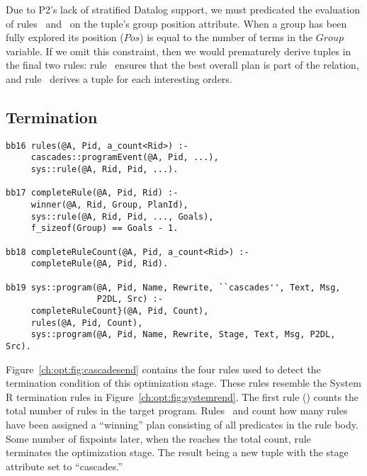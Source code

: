 Due to P2's lack of stratified Datalog support, we must predicated the
evaluation of rules~ and~ on the  tuple's group
position attribute.  When a group has been fully explored its 
position ($Pos$) is equal to the number of terms in the $Group$ variable.  If
we omit this constraint, then we would prematurely derive  tuples in
the final two rules: rule~ ensures that the best overall plan is part
of the  relation, and rule~ derives a  tuple for
each interesting orders.

\subsection{Termination}
\label{ch:opt:sec:cascadesend}

\begin{figure*}
\ssp
\centering
\begin{lstlisting}
bb16 rules(@A, Pid, a_count<Rid>) :-
     cascades::programEvent(@A, Pid, ...),
     sys::rule(@A, Rid, Pid, ...).

bb17 completeRule(@A, Pid, Rid) :-
     winner(@A, Rid, Group, PlanId),
     sys::rule(@A, Rid, Pid, ..., Goals),
     f_sizeof(Group) == Goals - 1.

bb18 completeRuleCount(@A, Pid, a_count<Rid>) :-
     completeRule(@A, Pid, Rid).

bb19 sys::program(@A, Pid, Name, Rewrite, ``cascades'', Text, Msg, 
                  P2DL, Src) :-
     completeRuleCount}(@A, Pid, Count),
     rules(@A, Pid, Count),
     sys::program(@A, Pid, Name, Rewrite, Stage, Text, Msg, P2DL, Src).
\end{lstlisting}
\caption{\label{ch:opt:fig:cascadesend}Cascades termination rules.}
\end{figure*}

Figure~\ref{ch:opt:fig:cascadesend} contains the four rules used to detect the
termination condition of this optimization stage.  These rules resemble the
System R termination rules in Figure~\ref{ch:opt:fig:systemrend}.  The first
rule () counts the total number of rules in the target program.
Rules~ and  count how many rules have been assigned a
``winning'' plan consisting of all predicates in the rule body.  Some number of
fixpoints later, when the  reaches the total 
count, rule~ terminates the optimization stage.  The result being a
new  tuple with the stage attribute set to ``cascades.''

